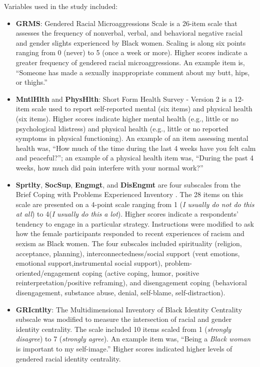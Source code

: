 \documentclass[
  english,
]{book}
\begin{document}
Variables used in the study included:

\begin{itemize}
\item
  \textbf{GRMS}: Gendered Racial Microaggressions Scale \citep{lewis_construction_2015} is a 26-item scale that assesses the frequency of nonverbal, verbal, and behavioral negative racial and gender slights experienced by Black women. Scaling is along six points ranging from 0 (never) to 5 (once a week or more). Higher scores indicate a greater frequency of gendered racial microaggressions. An example item is, ``Someone has made a sexually inappropriate comment about my butt, hips, or thighs.''
\item
  \textbf{MntlHlth} and \textbf{PhysHlth}: Short Form Health Survey - Version 2 \citep{ware_comparison_1995} is a 12-item scale used to report self-reported mental (six items) and physical health (six items).
  Higher scores indicate higher mental health (e.g., little or no psychological ldistress) and physical health (e.g., little or no reported symptoms in physical functioning). An example of an item assessing mental health was, ``How much of the time during the last 4 weeks have you felt calm and peaceful?''; an example of a physical health item was, ``During the past 4 weeks, how much did pain interfere with your normal work?''
\item
  \textbf{Sprtlty}, \textbf{SocSup}, \textbf{Engmgt}, and \textbf{DisEngmt} are four subscales from the Brief Coping with Problems Experienced Inventory \citep{carver_you_1997}. The 28 items on this scale are presented on a 4-point scale ranging from 1 (\emph{I usually do not do this at all}) to 4(\emph{I usually do this a lot}). Higher scores indicate a respondents' tendency to engage in a particular strategy. Instructions were modified to ask how the female participants responded to recent experiences of racism and sexism as Black women. The four subscales included spirituality (religion, acceptance, planning), interconnectedness/social support (vent emotions, emotional support,instrumental social support), problem-oriented/engagement coping (active coping, humor, positive reinterpretation/positive reframing), and disengagement coping (behavioral disengagement, substance abuse, denial, self-blame, self-distraction).
\item
  \textbf{GRIcntlty}: The Multidimensional Inventory of Black Identity Centrality subscale \citep{sellers_multidimensional_nodate} was modified to measure the intersection of racial and gender identity centrality. The scale included 10 items scaled from 1 (\emph{strongly disagree}) to 7 (\emph{strongly agree}). An example item was, ``Being a \emph{Black woman} is important to my self-image.'' Higher scores indicated higher levels of gendered racial identity centrality.
\end{itemize}
\end{document}
